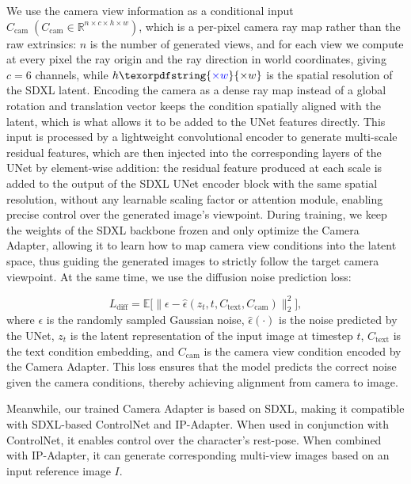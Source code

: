 \documentclass[lettersize,journal]{IEEEtran}
\newcommand{\blu}[1]{\texorpdfstring{{\leavevmode\color{blue}#1}}{#1}}
\begin{document}
We use the camera view information as a conditional input
\(C_{\text{cam}} \; (C_{\text{cam}} \in \mathbb{R}^{n \times c \times h \times w})\),
\blu{which is a per-pixel camera ray map rather than the raw extrinsics:} \(n\) \blu{is the number of
generated views, and for each view we compute at every pixel the ray origin and the ray
direction in world coordinates, giving} \(c=6\) \blu{channels, while} \(h \blu{\times w}\) \blu{is the spatial
resolution of the SDXL latent. Encoding the camera as a dense ray map instead of a global
rotation and translation vector keeps the condition spatially aligned with the latent, which
is what allows it to be added to the UNet features directly.}
This input is processed by a lightweight convolutional encoder to generate multi-scale
residual features, which are then injected into the corresponding layers of the UNet
\blu{by element-wise addition: the residual feature produced at each scale is added to
the output of the SDXL UNet encoder block with the same spatial resolution, without any
learnable scaling factor or attention module,} enabling precise control over the generated
image's viewpoint.
During training, we keep the weights of the SDXL backbone frozen and only optimize the Camera Adapter, 
allowing it to learn how to map camera view conditions into the latent space, thus guiding the generated images to strictly follow the target camera viewpoint. At the same time, we use the diffusion noise prediction loss:

\begin{equation} \label{Eq.Ldiff}
L_{\text{diff}} = \mathbb{E} \Big[ \| \epsilon - \hat{\epsilon}(z_t, t, C_\text{text}, C_\text{cam}) \|_2^2 \Big],
\end{equation}
where 
\(\epsilon\) is the randomly sampled Gaussian noise, 
\(\hat{\epsilon}(\cdot)\) is the noise predicted by the UNet, 
\(z_t\) is the latent representation of the input image at timestep \(t\), 
\(C_\text{text}\) is the text condition embedding, 
and \(C_\text{cam}\) is the camera view condition encoded by the Camera Adapter. This loss ensures that the model predicts the correct noise given the camera conditions, thereby achieving alignment from camera to image.

Meanwhile, our trained Camera Adapter is based on SDXL, making it compatible with SDXL-based ControlNet and IP-Adapter. When used in conjunction with ControlNet, it enables control over the character's rest-pose. 
When combined with IP-Adapter, it can generate corresponding multi-view images based on an input reference image \(I\).
\end{document}
